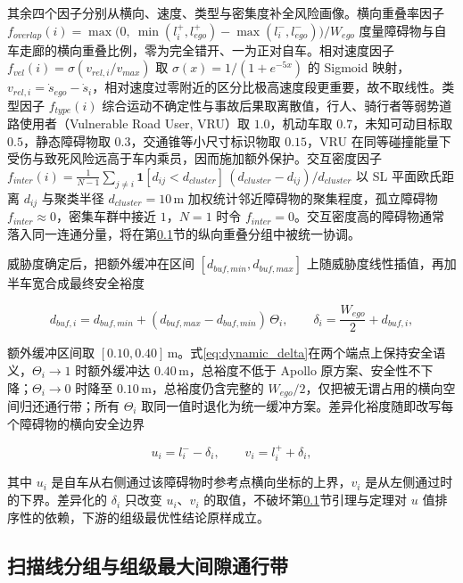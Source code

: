 \documentclass[a4paper,zihao=5]{ctexart}
\theoremstyle{definition}
\begin{document}
其余四个因子分别从横向、速度、类型与密集度补全风险画像。横向重叠率因子 $f_{overlap}(i)=\max\!\big(0,\ \min(l_i^{+}, l_{ego}^{+}) - \max(l_i^{-}, l_{ego}^{-})\big)/W_{ego}$ 度量障碍物与自车走廊的横向重叠比例，零为完全错开、一为正对自车。相对速度因子 $f_{vel}(i)=\sigma(v_{rel,i}/v_{max})$ 取 $\sigma(x)=1/(1+e^{-5x})$ 的 Sigmoid 映射，$v_{rel,i}=\dot{s}_{ego}-\dot{s}_i$，相对速度过零附近的区分比极高速度段更重要，故不取线性。类型因子 $f_{type}(i)$ 综合运动不确定性与事故后果取离散值，行人、骑行者等弱势道路使用者（Vulnerable Road User, VRU）取 $1.0$，机动车取 $0.7$，未知可动目标取 $0.5$，静态障碍物取 $0.3$，交通锥等小尺寸标识物取 $0.15$，VRU 在同等碰撞能量下受伤与致死风险远高于车内乘员，因而施加额外保护。交互密度因子 $f_{inter}(i) = \frac{1}{N-1} \sum_{j \neq i} \mathbf{1}[d_{ij} < d_{cluster}] \,(d_{cluster} - d_{ij})/d_{cluster}$ 以 SL 平面欧氏距离 $d_{ij}$ 与聚类半径 $d_{cluster}=10$\,m 加权统计邻近障碍物的聚集程度，孤立障碍物 $f_{inter}\approx 0$，密集车群中接近 $1$，$N=1$ 时令 $f_{inter}=0$。交互密度高的障碍物通常落入同一连通分量，将在第\ref{sec:method_band}节的纵向重叠分组中被统一协调。

威胁度确定后，把额外缓冲在区间 $[d_{buf,min}, d_{buf,max}]$ 上随威胁度线性插值，再加半车宽合成最终安全裕度

\begin{equation}
    d_{buf,i} = d_{buf,min} + (d_{buf,max} - d_{buf,min})\,\Theta_i, \qquad
    \delta_i = \frac{W_{ego}}{2} + d_{buf,i},
    \label{eq:dynamic_delta}
\end{equation}

额外缓冲区间取 $[0.10, 0.40]$\,m。式\eqref{eq:dynamic_delta}在两个端点上保持安全语义，$\Theta_i \to 1$ 时额外缓冲达 $0.40$\,m，总裕度不低于 Apollo 原方案、安全性不下降；$\Theta_i \to 0$ 时降至 $0.10$\,m，总裕度仍含完整的 $W_{ego}/2$，仅把被无谓占用的横向空间归还通行带；所有 $\Theta_i$ 取同一值时退化为统一缓冲方案。差异化裕度随即改写每个障碍物的横向安全边界

\begin{equation}
    u_i = l_i^{-} - \delta_i, \qquad v_i = l_i^{+} + \delta_i,
    \label{eq:dynamic_uv}
\end{equation}

其中 $u_i$ 是自车从右侧通过该障碍物时参考点横向坐标的上界，$v_i$ 是从左侧通过时的下界。差异化的 $\delta_i$ 只改变 $u_i$、$v_i$ 的取值，不破坏第\ref{sec:method_band}节引理与定理对 $u$ 值排序性的依赖，下游的组级最优性结论原样成立。

\subsection{扫描线分组与组级最大间隙通行带}
\label{sec:method_band}
\end{document}
